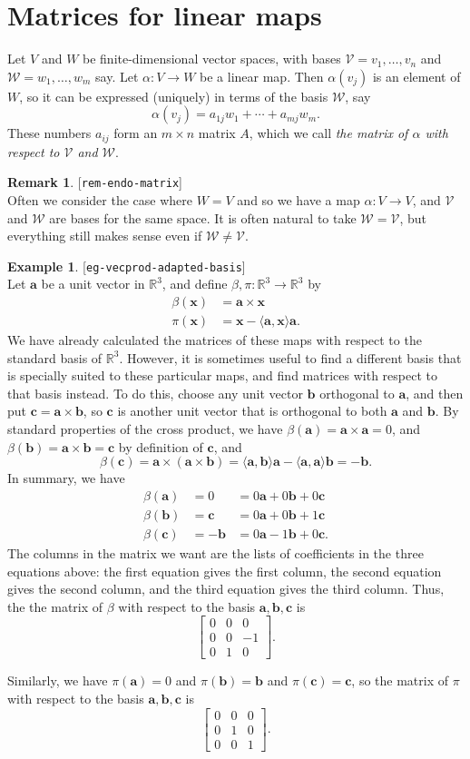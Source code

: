 \documentclass{amsart}
\newcommand{\lbl}[1]{\label{#1}\textup{[\texttt{#1}]}\ \\}
\newcommand{\lbl}{\label}
\newcommand{\R}         {{\mathbb{R}}}
\newcommand{\bsm}       {\left[\begin{smallmatrix}}
\newcommand{\esm}       {\end{smallmatrix}\right]}
\newcommand{\al}        {\alpha}
\newcommand{\bt}        {\beta}
\newcommand{\tm}        {\times}
\newcommand{\xra}       {\xrightarrow}
\newcommand{\ip}[1]     {\langle #1\rangle}
\newcommand{\va}        {\mathbf{a}}
\newcommand{\vb}        {\mathbf{b}}
\newcommand{\vc}        {\mathbf{c}}
\newcommand{\vx}        {\mathbf{x}}
\newcommand{\CV}        {{\mathcal{V}}}
\newcommand{\CW}        {{\mathcal{W}}}
\renewcommand{\:}       {\colon}
\theoremstyle{definition}
\newtheorem{remark}[theorem]{Remark}
\newtheorem{example}[theorem]{Example}
\begin{document}
\section{Matrices for linear maps}
\label{sec-matrices}

Let $V$ and $W$ be finite-dimensional vector spaces, with
bases $\CV=v_1,\dotsc,v_n$ and $\CW=w_1,\dotsc,w_m$ say.
Let $\al\:V\to W$ be a linear map.  Then $\al(v_j)$ is an
element of $W$, so it can be expressed (uniquely) in terms
of the basis $\CW$, say
\[ \al(v_j) = a_{1j}w_1 + \dotsb + a_{mj} w_m. \]
These numbers $a_{ij}$ form an $m\tm n$ matrix $A$, which we
call \emph{the matrix of $\al$ with respect to $\CV$ and
 $\CW$}.  
\begin{remark}\lbl{rem-endo-matrix}
 Often we consider the case where $W=V$ and so we have a map
 $\al\:V\to V$, and $\CV$ and $\CW$ are bases for the same
 space.  It is often natural to take $\CW=\CV$, but
 everything still makes sense even if $\CW\neq\CV$.
\end{remark}

\begin{example}\lbl{eg-vecprod-adapted-basis}
 Let $\va$ be a unit vector in $\R^3$, and define
 $\bt,\pi\:\R^3\xra{}\R^3$ by 
 \begin{align*}
   \bt(\vx) &= \va \tm \vx \\
   \pi(\vx) &= \vx - \ip{\va,\vx} \va.
 \end{align*}
 We have already calculated the matrices of these maps with
 respect to the standard basis of $\R^3$.  However, it is
 sometimes useful to find a different basis that is
 specially suited to these particular maps, and find
 matrices with respect to that basis instead.  To do this,
 choose any unit vector $\vb$ orthogonal to $\va$, and then
 put $\vc=\va\tm\vb$, so $\vc$ is another unit vector that
 is orthogonal to both $\va$ and $\vb$.  By standard properties of the
 cross product, we have $\bt(\va)=\va\tm\va=0$, and
 $\bt(\vb)=\va\tm\vb=\vc$ by definition of $\vc$, and 
 \[ \bt(\vc)=\va\tm(\va\tm\vb)=
     \ip{\va,\vb}\va-\ip{\va,\va}\vb = -\vb. 
 \]
 In summary, we have
 \begin{align*}
   \bt(\va) &= 0    &= 0\va + 0\vb + 0\vc \\
   \bt(\vb) &= \vc  &= 0\va + 0\vb + 1\vc \\
   \bt(\vc) &= -\vb &= 0\va - 1\vb + 0\vc.
 \end{align*}
 The columns in the matrix we want are the lists of
 coefficients in the three equations above: the first
 equation gives the first column, the second equation gives
 the second column, and the third equation gives the third
 column.  Thus, the the matrix of $\bt$ with respect to the
 basis $\va,\vb,\vc$ is 
 \[ \bsm 0 & 0 & 0 \\ 0 & 0 & -1 \\ 0 & 1 & 0 \esm. \]

 Similarly, we have $\pi(\va)=0$ and $\pi(\vb)=\vb$ and
 $\pi(\vc)=\vc$, so the matrix of $\pi$ with respect to the
 basis $\va,\vb,\vc$ is 
 \[ \bsm 0 & 0 & 0 \\ 0 & 1 & 0 \\ 0 & 0 & 1 \esm. \]
\end{example}
\end{document}
